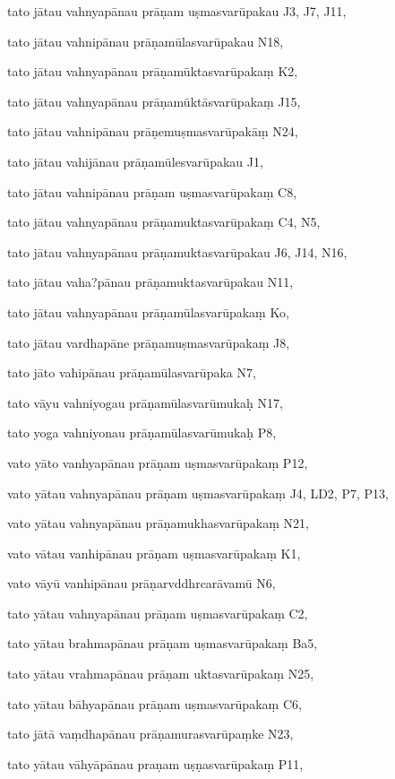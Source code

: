 \begin{marma}[hp03_056]


\item[tato jātau vahnyapānau prāṇam uṣmasvarūpakau] J3, J7, J11, 
\item[tato jātau vahnipānau prāṇamūlasvarūpakau] N18,
\item[tato jātau vahnyapānau prāṇamūktasvarūpakaṃ] K2,
\item[tato jātau vahnyapānau prāṇamūktāsvarūpakaṃ] J15,
\item[tato jātau vahnipānau prāṇemuṣmasvarūpakāṃ] N24,
\item[tato jātau vahijānau prāṇamūlesvarūpakau] J1,
\item[tato jātau vahnipānau prāṇam uṣmasvarūpakaṃ] C8,
\item[tato jātau vahnyapānau prāṇamuktasvarūpakaṃ] C4, N5, 
\item[tato jātau vahnyapānau prāṇamuktasvarūpakau] J6, J14, N16, 
\item[tato jātau vaha?pānau prāṇamuktasvarūpakau] N11,
\item[tato jātau vahnyapānau prāṇamūlasvarūpakaṃ] Ko,
\item[tato jātau vardhapāne prāṇamuṣmasvarūpakaṃ] J8,
\item[tato jāto vahipānau prāṇamūlasvarūpaka] N7,
\item[tato vāyu vahniyogau prāṇamūlasvarūmukaḥ] N17,
\item[tato yoga vahniyonau prāṇamūlasvarūmukaḥ] P8,
\item[vato yāto vanhyapānau prāṇam uṣmasvarūpakaṃ] P12,
\item[vato yātau vahnyapānau prāṇam uṣmasvarūpakaṃ] J4, LD2, P7, P13, 
\item[vato yātau vahnyapānau prāṇamukhasvarūpakaṃ] N21,
\item[vato vātau vanhipānau prāṇam uṣmasvarūpakaṃ] K1, 
\item[vato vāyū vanhipānau prāṇarvddhrcarāvamū] N6,
\item[tato yātau vahnyapānau prāṇam uṣmasvarūpakaṃ] C2,
\item[tato yātau brahmapānau prāṇam uṣmasvarūpakaṃ] Ba5, 
\item[tato yātau vrahmapānau prāṇam uktasvarūpakaṃ] N25,
\item[tato yātau bāhyapānau prāṇam uṣmasvarūpakaṃ] C6,
\item[tato jātā vaṃdhapānau prāṇamurasvarūpaṃke] N23,
\item[tato yātau vāhyāpānau praṇam uṣṇasvarūpakaṃ] P11,

\end{marma}
